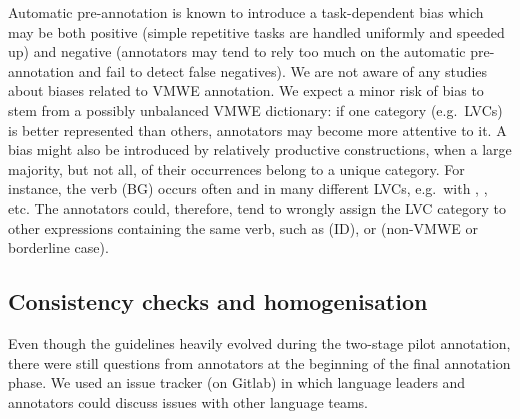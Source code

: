 \documentclass[output=paper,
modfonts,
]{langscibook}
\begin{document}
Automatic pre-annotation is known to introduce a task-dependent bias \citep{Marcus:1993:BLA:972470.972475,Fort:2010:IPP:1868720.1868727} which may be both positive (simple repetitive tasks are handled uniformly and speeded up) and negative (annotators may tend to rely too much on the automatic pre-annotation and fail to detect false negatives). We are not aware of any studies about biases related to VMWE annotation. We expect a minor risk of bias to stem from a possibly unbalanced VMWE dictionary: if one category (e.g.\ LVCs) is better represented than others, annotators may become more attentive to it. A bias might also be introduced by relatively productive constructions, when a large majority, but not all, of their occurrences belong to a unique category. For instance, the verb (BG)
 occurs often and in many different LVCs, e.g.\ with %
, %
, etc. The annotators could, therefore, tend to wrongly assign the LVC category to other expressions containing the same verb, such as  
 (ID), or %
 (non-VMWE or borderline case). 

\subsection{Consistency checks and homogenisation}
\label{sec:consistency}
%

Even though the guidelines heavily evolved during the two-stage pilot annotation, there were still questions from annotators at the beginning of the final annotation phase. We used an issue tracker (on Gitlab) in which language leaders and annotators could discuss issues with other language teams.

 
\end{document}
